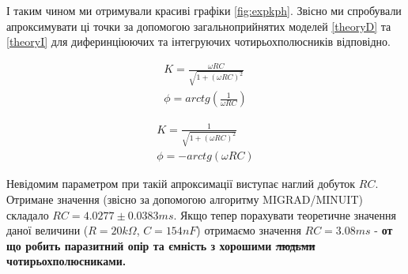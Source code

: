 І таким чином ми отримували красиві графіки \ref{fig:expkph}. Звісно ми спробували апроксимувати ці точки за допомогою загальноприйнятих моделей \ref{theoryD} та \ref{theoryI} для диферинціюючих та інтегруючих чотирьохполюсників відповідно. 

\begin{equation}
	\begin{aligned}
		K = \frac{\omega RC}{\sqrt{1+(\omega R C)^2}}\\
		\phi = arctg(\frac{1}{\omega RC})
	\end{aligned}
	\label{theoryD}
\end{equation}

\begin{equation}
	\begin{aligned}
		K = \frac{1}{\sqrt{1+(\omega R C)^2}}\\
		\phi = -arctg(\omega RC)
	\end{aligned}
	\label{theoryI}
\end{equation}

Невідомим параметром при такій апроксимації виступає наглий добуток $RC$. Отримане значення (звісно за допомогою алгоритму MIGRAD/MINUIT) складало $RC = 4.0277 \pm  0.0383 ms$. 
Якщо тепер порахувати теоретичне значення даної величини ($R = 20k\Omega$, $C = 154nF$) отримаємо значення $RC = 3.08 ms$ - \textbf{от що робить паразитний опір та ємність з хорошими \sout{людьми} чотирьохполюсниками.}

